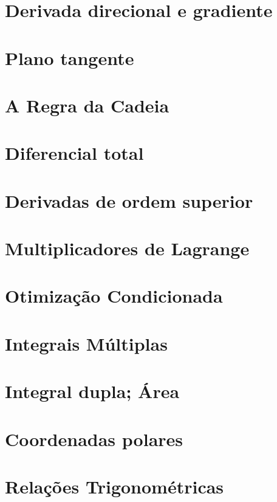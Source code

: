 \documentclass[a4paper,12pt,openany]{book}
\theoremstyle{definition}
\begin{document}
\section{Derivada direcional e gradiente}
\section{Plano tangente}
\section{A Regra da Cadeia}
\section{Diferencial total}
\section{Derivadas de ordem superior}
\section{Multiplicadores de Lagrange}

\section{Otimização Condicionada}


\section{Integrais Múltiplas}
\section{Integral dupla; Área}
\section{Coordenadas polares}
\section{Relações Trigonométricas}

\end{document}
